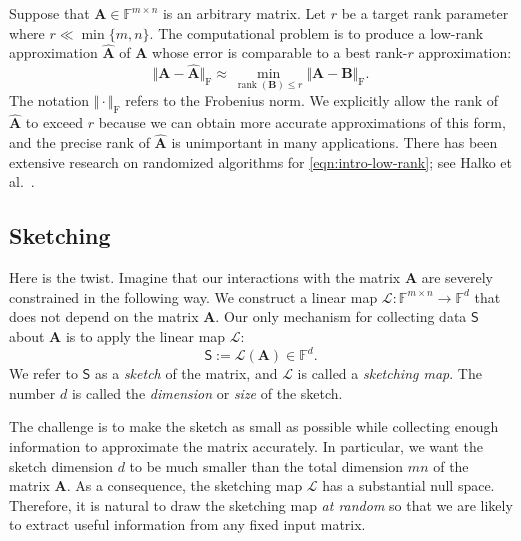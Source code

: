 \documentclass[final]{siamart1116}
\numberwithin{equation}{section}
\numberwithin{theorem}{section}
\numberwithin{figure}{section}
\newcommand{\F}{\mathbb{F}}
\newcommand{\mtx}[1]{\bm{#1}}
\newcommand{\rank}{\operatorname{rank}}
\newcommand{\norm}[1]{\Vert #1 \Vert}
\newcommand{\fnorm}[1]{\norm{#1}_{\mathrm{F}}}
\begin{document}
Suppose that $\mtx{A} \in \F^{m \times n}$ is an arbitrary matrix.
Let $r$ be a target rank parameter where $r \ll \min\{m ,n\}$.
The computational problem is to produce a low-rank approximation $\hat{\mtx{A}}$
of $\mtx{A}$ whose error is comparable to a best rank-$r$ approximation:
\begin{equation} \label{eqn:intro-low-rank}
\fnorm{ \mtx{A} - \hat{\mtx{A}}} \approx \min_{\rank(\mtx{B}) \leq r} \fnorm{ \mtx{A} - \mtx{B} }.
\end{equation}
The notation $\fnorm{\cdot}$ refers to the Frobenius norm.
We explicitly allow the rank of $\hat{\mtx{A}}$ to exceed
$r$ because we can obtain more accurate approximations of this form,
and the precise rank of $\hat{\mtx{A}}$ is unimportant in many applications.
There has been extensive research on randomized algorithms for \cref{eqn:intro-low-rank};
see Halko et al.~\cite{HMT11:Finding-Structure}.

\subsection{Sketching}

Here is the twist.
Imagine that our interactions with the matrix $\mtx{A}$ are severely constrained
in the following way.
We construct a linear map $\mathcal{L} : \F^{m \times n} \to \F^d$
that does not depend on the matrix $\mtx{A}$.  Our only mechanism for collecting
data $\mathsf{S}$ about $\mtx{A}$ is to apply the linear map $\mathcal{L}$:
\begin{equation} \label{eqn:lin-sketch}
\mathsf{S} := \mathcal{L}(\mtx{A}) \in \F^d.
\end{equation}
We refer to $\mathsf{S}$ as a \emph{sketch} of the matrix,
and $\mathcal{L}$ is called a \emph{sketching map}.  The
number $d$ is called the \emph{dimension} or \emph{size}
of the sketch.


The challenge is to make the sketch as small as possible
while collecting enough information to approximate the matrix accurately.
In particular, we want the sketch dimension $d$ to be much smaller than the total dimension $mn$
of the matrix $\mtx{A}$.  As a consequence, the sketching map $\mathcal{L}$ has a substantial null space.
Therefore, it is natural to draw the sketching map \emph{at random} so that we
are likely to extract useful information from any fixed input matrix.
\end{document}
